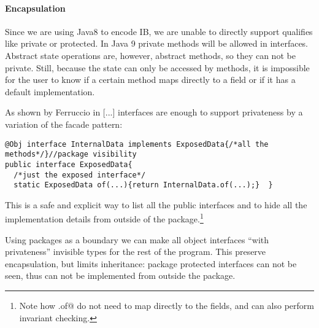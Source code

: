 \begin{comment}
@Obj interface Person$ extends Person{//will be further expanded by @Obj
  void name(String val);
  default void rename(String newName){ if(/*valid name*/){ this.name(val);}}
  String name();
  static Person from(String val){ if(/*valid name*/){return Person$.of(val);}
    throw /*invalid name*/}  }
\end{lstlisting}

This is not a perfect solution, since
\Q@Person$@ can still be seen inside the \Q@Person@ package and heirs of
\Q@Person$@,
however it is surprising we achieve such of a good result without any language
support for privacy in interfaces.
\end{comment}

\paragraph{Encapsulation} %
Since we are using Java8 to encode IB, we are unable to directly support qualifies
like private or protected. In Java 9 private methods will be allowed in
interfaces. Abstract state operations are, however, abstract methods,
so they can not be private.
Still, because the state can only be accessed by methods, it 
is impossible for the user to know if a certain method maps directly to a field
or if it has a default implementation. 

As shown by Ferruccio in [...] interfaces are enough to support privateness by a
 variation of the facade pattern:
\begin{lstlisting}
@Obj interface InternalData implements ExposedData{/*all the methods*/}//package visibility
public interface ExposedData{
  /*just the exposed interface*/
  static ExposedData of(...){return InternalData.of(...);}  }
\end{lstlisting}

This is a safe and explicit way to list all the public interfaces and to hide all the implementation
details from outside of the package.\footnote{
Note how \Q@ExposedData.of@ do not need to map directly to the fields, and can also perform 
invariant checking.}

Using packages as a boundary we can make all object interfaces ``with privateness''
invisible types for the rest of the program.
This preserve encapsulation, but limits inheritance:
package protected interfaces can not be seen,
thus can not be implemented from outside the package.

